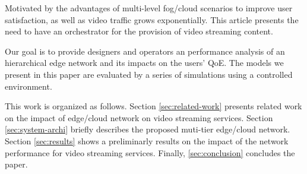 Motivated by the advantages of multi-level fog/cloud scenarios to improve user satisfaction, as well as video traffic grows exponentially. This article presents the need to have an orchestrator for the provision of video streaming content.

Our goal is to provide designers and operators an performance analysis  of an hierarchical edge network and its impacts on the users' QoE. The models we present in this paper are evaluated by a series of simulations using a controlled environment.

This work is organized as follows.
Section \ref{sec:related-work} presents related work on the impact of edge/cloud network on video streaming services.
Section \ref{sec:system-archi} briefly describes the proposed muti-tier edge/cloud network.
Section \ref{sec:results} shows a preliminarly results on the impact of the network performance for video streaming services.
Finally, \ref{sec:conclusion} concludes the paper.